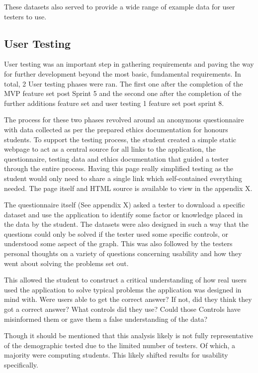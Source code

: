 These datasets also served to provide a wide range of example data for user testers to use.

\subsection{User Testing} \label{usertest1}
User testing was an important step in gathering requirements and paving the way for further development beyond the most basic, fundamental requirements. In total, 2 User testing phases were ran. The first one after the completion of the MVP feature set post Sprint 5 and the second one after the completion of the further additions feature set and user testing 1 feature set post sprint 8.

The process for these two phases revolved around an anonymous questionnaire with data collected as per the prepared ethics documentation for honours students.
To support the testing process, the student created a simple static webpage to act as a central source for all links to the application, the questionnaire, testing data and ethics documentation that guided a tester through the entire process. Having this page really simplified testing as the student would only need to share a single link which self-contained everything needed. The page itself and HTML source is available to view in the appendix X.

The questionnaire itself (See appendix X) asked a tester to download a specific dataset and use the application to identify some factor or knowledge placed in the data by the student. The datasets were also designed in such a way that the questions could only be solved if the tester used some specific controls, or understood some aspect of the graph. This was also followed by the testers personal thoughts on a variety of questions concerning usability and how they went about solving the problems set out.

This allowed the student to construct a critical understanding of how real users used the application to solve typical problems the application was designed in mind with. Were users able to get the correct answer? If not, did they think they got a correct answer? What controls did they use? Could those Controls have misinformed them or gave them a false understanding of the data?

Though it should be mentioned that this analysis likely is not fully representative of the demographic tested due to the limited number of testers. Of which, a majority were computing students. This likely shifted results for usability specifically.

